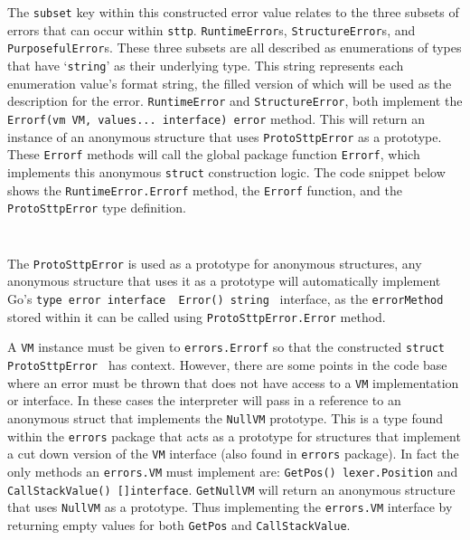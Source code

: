 The \verb|subset| key within this constructed error value relates to the three subsets of errors that can occur within \verb|sttp|. \verb|RuntimeError|s, \verb|StructureError|s, and \verb|PurposefulError|s. These three subsets are all described as enumerations of types that have `\texttt{string}' as their underlying type. This string represents each enumeration value's format string, the filled version of which will be used as the description for the error. \verb|RuntimeError| and \verb|StructureError|, both implement the \texttt{Errorf(vm VM, values... interface{}) error} method. This will return an instance of an anonymous structure that uses \verb|ProtoSttpError| as a prototype. These \verb|Errorf| methods will call the global package function \verb|Errorf|, which implements this anonymous \texttt{struct} construction logic. The code snippet below shows the \verb|RuntimeError.Errorf| method, the \verb|Errorf| function, and the \verb|ProtoSttpError| type definition.

\inputminted[firstline=73, lastline=105, autogobble, breaklines, tabsize=4]{go}{../../src/errors/errors.go}

\inputminted[firstline=8, lastline=23, autogobble, breaklines, tabsize=4]{go}{../../src/errors/errors.go}

The \verb|ProtoSttpError| is used as a prototype for anonymous structures, any anonymous structure that uses it as a prototype will automatically implement Go's \texttt{type error interface { Error() string }} interface, as the \verb|errorMethod| stored within it can be called using \verb|ProtoSttpError.Error| method.

A \verb|VM| instance must be given to \verb|errors.Errorf| so that the constructed \texttt{struct { ProtoSttpError }} has context. However, there are some points in the code base where an error must be thrown that does not have access to a \verb|VM| implementation or interface. In these cases the interpreter will pass in a reference to an anonymous struct that implements the \verb|NullVM| prototype. This is a type found within the \verb|errors| package that acts as a prototype for structures that implement a cut down version of the \verb|VM| interface (also found in \verb|errors| package). In fact the only methods an \verb|errors.VM| must implement are: \texttt{GetPos() lexer.Position} and \texttt{CallStackValue() []interface{}}. \verb|GetNullVM| will return an anonymous structure that uses \verb|NullVM| as a prototype. Thus implementing the \verb|errors.VM| interface by returning empty values for both \verb|GetPos| and \verb|CallStackValue|.

